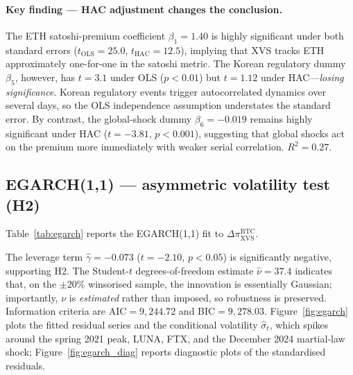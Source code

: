 \documentclass[11pt,a4paper]{article}
\begin{document}
\begin{table}[H]
\centering
\caption{OLS estimation of Eq.~(\ref{eq:reg}). $N=1{,}904$. Dependent variable
$\pi^{\text{BTC}}_{\text{XVS}}$.}
\label{tab:regression}

\end{table}

\paragraph{Key finding --- HAC adjustment changes the conclusion.}
The ETH satoshi-premium coefficient $\beta_1=1.40$ is highly significant under both standard errors
($t_{\text{OLS}}=25.0$, $t_{\text{HAC}}=12.5$), implying that XVS tracks ETH approximately one-for-one
in the satoshi metric. The Korean regulatory dummy $\beta_5$, however, has $t=3.1$ under OLS
($p<0.01$) but $t=1.12$ under HAC---\emph{losing significance}. Korean regulatory events trigger
autocorrelated dynamics over several days, so the OLS independence assumption understates the
standard error. By contrast, the global-shock dummy $\beta_6=-0.019$ remains highly significant
under HAC ($t=-3.81$, $p<0.001$), suggesting that global shocks act on the premium more immediately
with weaker serial correlation. $R^2=0.27$.

\subsection{EGARCH(1,1) --- asymmetric volatility test (H2)}
Table~\ref{tab:egarch} reports the EGARCH(1,1) fit to $\Delta\pi^{\text{BTC}}_{\text{XVS}}$.

\begin{table}[H]
\centering
\caption{EGARCH(1,1) estimation. $N=1{,}903$. Dependent variable
$\Delta\pi^{\text{BTC}}_{\text{XVS}}$.}
\label{tab:egarch}

\end{table}

The leverage term $\hat\gamma=-0.073$ ($t=-2.10$, $p<0.05$) is significantly negative, supporting
H2. The Student-$t$ degrees-of-freedom estimate $\hat\nu=37.4$ indicates that, on the
$\pm20\%$ winsorised sample, the innovation is essentially Gaussian; importantly, $\nu$ is
\emph{estimated} rather than imposed, so robustness is preserved. Information criteria are
AIC$=9{,}244.72$ and BIC$=9{,}278.03$. Figure~\ref{fig:egarch} plots the fitted residual series and
the conditional volatility $\hat\sigma_t$, which spikes around the spring 2021 peak, LUNA, FTX, and
the December 2024 martial-law shock; Figure~\ref{fig:egarch_diag} reports diagnostic plots of the
standardised residuals.
\end{document}
